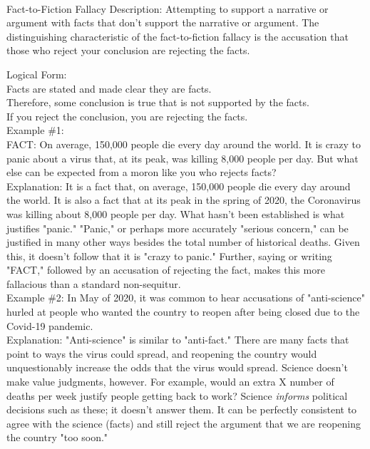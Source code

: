 \documentclass[a4paper,12pt,single,pdftex]{scrbook}
\begin{document}
    
      
    \\

  

Fact-to-Fiction Fallacy
    Description: Attempting to support a narrative or argument with facts that don't support the narrative or argument. The distinguishing characteristic of the fact-to-fiction fallacy is the accusation that those who reject your conclusion are rejecting the facts.

    
      Logical Form:
    \\

    
      Facts are stated and made clear they are facts.
    \\

    
      Therefore, some conclusion is true that is not supported by the facts.
    \\

    
      If you reject the conclusion, you are rejecting the facts.
    \\

    
      Example \#1:
    \\

    
      FACT: On average, 150,000 people die every day around the world. It is crazy to panic about a virus that, at its peak, was killing 8,000 people per day. But what else can be expected from a moron like you who rejects facts?
    \\

    
      Explanation: It is a fact that, on average, 150,000 people die every day around the world. It is also a fact that at its peak in the spring of 2020, the Coronavirus was killing about 8,000 people per day. What hasn't been established is what justifies "panic." "Panic," or perhaps more accurately "serious concern," can be justified in many other ways besides the total number of historical deaths. Given this, it doesn't follow that it is "crazy to panic." Further, saying or writing "FACT," followed by an accusation of rejecting the fact, makes this more fallacious than a standard non-sequitur.
    \\

    
      Example \#2: In May of 2020, it was common to hear accusations of "anti-science" hurled at people who wanted the country to reopen after being closed due to the Covid-19 pandemic.
    \\

    
      Explanation: "Anti-science" is similar to "anti-fact." There are many facts that point to ways the virus could spread, and reopening the country would unquestionably increase the odds that the virus would spread. Science doesn't make value judgments, however. For example, would an extra X number of deaths per week justify people getting back to work? Science {\em informs} political decisions such as these; it doesn't answer them. It can be perfectly consistent to agree with the science (facts) and still reject the argument that we are reopening the country "too soon."
    \\
\end{document}

